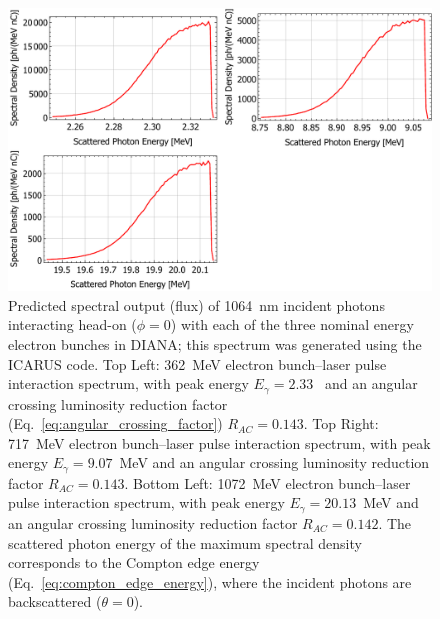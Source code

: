 \documentclass[../main.tex]{subfiles}
\begin{document}
\begin{figure}[!h]
\centering
\includegraphics[width=\textwidth]{Figures/DIANA_Inverse_Compton_Source_Design/DIANA_spectra.pdf}
\caption{Predicted spectral output (flux) of 1064~\si{\nano\meter} incident photons interacting head-on ($\phi=0$) with each of the three nominal energy electron bunches in DIANA; this spectrum was generated using the \textsc{ICARUS} code. Top Left: 362~\si{\mega\electronvolt}  electron bunch--laser pulse interaction spectrum, with peak energy $E_{\gamma}=2.33$~\si{\megaelectronvolt} and an angular crossing luminosity reduction factor (Eq.~\ref{eq:angular_crossing_factor}) $R_{AC}=0.143$. Top Right: 717~\si{\mega\electronvolt}  electron bunch--laser pulse interaction spectrum, with peak energy $E_{\gamma}=9.07$~\si{\mega\electronvolt} and an angular crossing luminosity reduction factor  $R_{AC}=0.143$. Bottom Left: 1072~\si{\mega\electronvolt}  electron bunch--laser pulse interaction spectrum, with peak energy $E_{\gamma}=20.13$~\si{\mega\electronvolt} and an angular crossing luminosity reduction factor $R_{AC}=0.142$. The scattered photon energy of the maximum spectral density corresponds to the Compton edge energy (Eq.~\ref{eq:compton_edge_energy}), where the incident photons are backscattered ($\theta = 0$). }
\label{fig:DIANA_spectra}
\end{figure}
\end{document}
